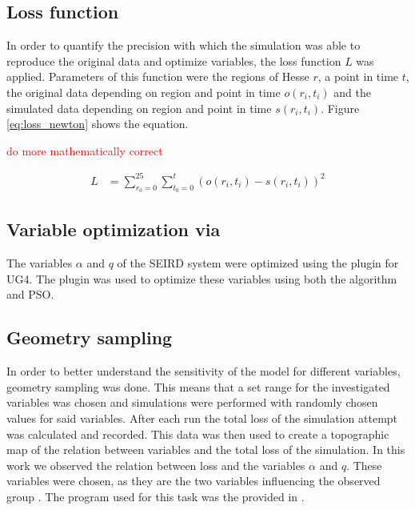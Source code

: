 \subsection{Loss function}
In order to quantify the precision with which the simulation was able to reproduce the original data and optimize variables, the loss function $L$
was applied. Parameters of this function were the regions of Hesse $r$, a point in time $t$, the original data depending on
region and point in time $o(r_i,t_i)$ and the simulated data depending on region and point in time $s(r_i, t_i)$. Figure \ref*{eq:loss_newton}
shows the equation.

\textcolor{red}{do more mathematically correct}

\begin{align}
	L &= \sum_{r_0=0}^{25} \sum_{t_{0}=0}^{t} (o(r_i,t_i) - s(r_i,t_i))^{2}
	\label{eq:loss_newton}
\end{align}


\subsection{Variable optimization via }
The variables $\alpha$ and $q$ of the SEIRD system were optimized using the  plugin for UG4\cite{Scheidemann}.
The plugin was used to optimize these variables using both the  algorithm and PSO.



\subsection{Geometry sampling}
In order to better understand the sensitivity of the model for different variables, geometry sampling was done. This means that a set range for the
investigated variables was chosen and simulations were performed with randomly chosen values for said variables. After each run the total
loss of the simulation attempt was calculated and recorded. This data was then used to create a topographic map of the relation between variables
and the total loss of the simulation. In this work we observed the relation between loss and the variables $\alpha$ and $q$. These variables
were chosen, as they are the two variables influencing the observed group . The program used for this task was the 
provided in .


